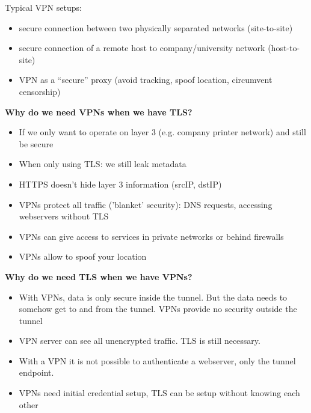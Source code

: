 \documentclass[11pt,oneside,a4paper]{article}
\begin{document}
Typical VPN setups:

\vspace{-\topsep}
\begin{itemize}
	\setlength{\itemsep}{0pt}
	\setlength{\parskip}{0pt}
	\item secure connection between two physically separated networks (site-to-site)
	\item secure connection of a remote host to company/university network (host-to-site)
	\item VPN as a “secure” proxy (avoid tracking, spoof location, circumvent censorship)
\end{itemize}
\vspace{-\topsep}

\textbf{Why do we need VPNs when we have TLS?}

\vspace{-\topsep}
\begin{itemize}
	\setlength{\itemsep}{0pt}
	\setlength{\parskip}{0pt}
	\item If we only want to operate on layer 3 (e.g. company printer network) and still be secure
	\item When only using TLS: we still leak metadata
	\item HTTPS doesn't hide layer 3 information (srcIP, dstIP)
	\item VPNs protect all traffic ('blanket' security): DNS requests, accessing webservers without TLS
	\item VPNs can give access to services in private networks or behind firewalls
	\item VPNs allow to spoof your location
\end{itemize}
\vspace{-\topsep}

\textbf{Why do we need TLS when we have VPNs?}

\vspace{-\topsep}
\begin{itemize}
	\setlength{\itemsep}{0pt}
	\setlength{\parskip}{0pt}
	\item With VPNs, data is only secure inside the tunnel. But the data needs to somehow get to and from the tunnel. VPNs provide no security outside the tunnel
	\item VPN server can see all unencrypted traffic. TLS is still necessary.
	\item With a VPN it is not possible to authenticate a webserver, only the tunnel endpoint.
	\item VPNs need initial credential setup, TLS can be setup without knowing each other
\end{itemize}
\vspace{-\topsep}
\end{document}
